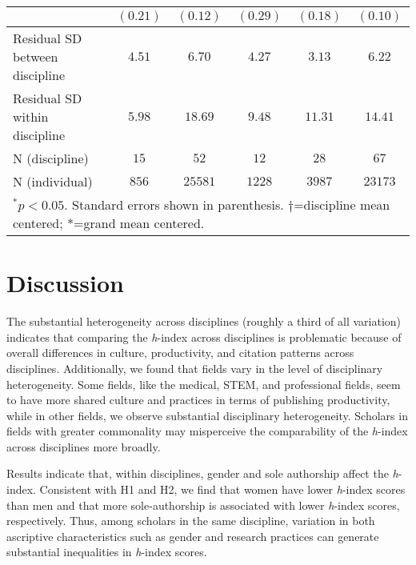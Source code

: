 \documentclass[
  10pt,
  letterpaper,
]{article}
\providecommand{\DIFaddendFL}{} %
\DeclareRobustCommand{\DIFaddendFL}{\DIFOaddendFL \let\includegraphics\DIFOincludegraphics} %
\begin{document}
\begin{table}
\begin{adjustwidth}{-1.5in}{0in}
{\begin{tabular}{l c c c c c}
                                        & $(0.21)$     & $(0.12)$     & $(0.29)$    & $(0.18)$     & $(0.10)$     \\
\hline
Residual SD between discipline          & $4.51$       & $6.70$       & $4.27$      & $3.13$       & $6.22$       \\
Residual SD within discipline           & $5.98$       & $18.69$      & $9.48$      & $11.31$      & $14.41$      \\
N (discipline)                          & $15$         & $52$         & $12$        & $28$         & $67$         \\
N (individual)                          & $856$        & $25581$      & $1228$      & $3987$       & $23173$      \\
\hline
\multicolumn{6}{l}{\scriptsize{$^{*}p<0.05$. Standard errors shown in parenthesis. $\dagger$=discipline mean centered; *=grand mean centered.}}
\end{tabular}
}
\DIFaddendFL \end{adjustwidth}
\end{table}%

\section{Discussion}\label{discussion}

The substantial heterogeneity across disciplines (roughly a third of all
variation) indicates that comparing the \emph{h}-index across
disciplines is problematic because of overall differences in culture,
productivity, and citation patterns across disciplines. Additionally, we
found that fields vary in the level of disciplinary heterogeneity. Some
fields, like the medical, STEM, and professional fields, seem to have
more shared culture and practices in terms of publishing productivity,
while in other fields, we observe substantial disciplinary
heterogeneity. Scholars in fields with greater commonality may
misperceive the comparability of the \emph{h}-index across disciplines
more broadly.

Results indicate that, within disciplines, gender and sole authorship
affect the \emph{h}-index. Consistent with H1 and H2, we find that women
have lower \emph{h}-index scores than men and that more sole-authorship
is associated with lower \emph{h}-index scores, respectively. Thus,
among scholars in the same discipline, variation in both ascriptive
characteristics such as gender and research practices can generate
substantial inequalities in \emph{h}-index scores.
\end{document}
